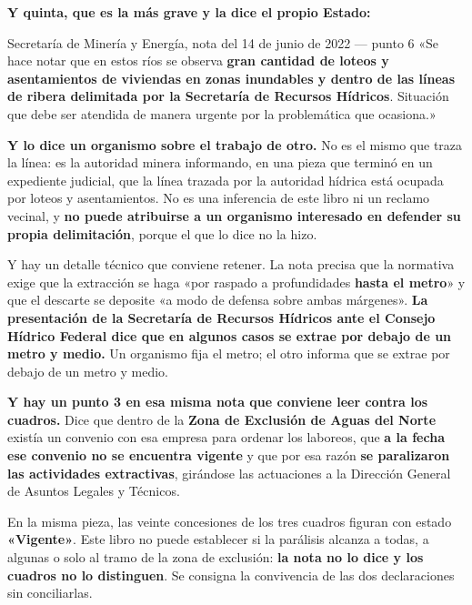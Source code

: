 \textbf{Y quinta, que es la más grave y la dice el propio Estado:}

\begin{ficha}{Secretaría de Minería y Energía, nota del 14 de junio de 2022 --- punto 6}
«Se hace notar que en estos ríos se observa \textbf{gran cantidad de loteos y asentamientos de
viviendas en zonas inundables y dentro de las líneas de ribera delimitada por la Secretaría de
Recursos Hídricos}. Situación que debe ser atendida de manera urgente por la problemática que
ocasiona.»
\end{ficha}

\textbf{Y lo dice un organismo sobre el trabajo de otro.} No es el mismo que traza la línea:
es la autoridad minera informando, en una pieza que terminó en un expediente judicial, que la
línea trazada por la autoridad hídrica está ocupada por loteos y asentamientos. No es una
inferencia de este libro ni un reclamo vecinal, y \textbf{no puede atribuirse a un organismo
interesado en defender su propia delimitación}, porque el que lo dice no la hizo.

Y hay un detalle técnico que conviene retener. La nota precisa que la normativa exige que la
extracción se haga «por raspado a profundidades \textbf{hasta el metro}» y que el descarte se
deposite «a modo de defensa sobre ambas márgenes». \textbf{La presentación de la Secretaría de
Recursos Hídricos ante el Consejo Hídrico Federal dice que en algunos casos se extrae por
debajo de un metro y medio.} Un organismo fija el metro; el otro informa que se extrae por
debajo de un metro y medio.

\begin{cautela}
\textbf{Y hay un punto 3 en esa misma nota que conviene leer contra los cuadros.} Dice que
dentro de la \textbf{Zona de Exclusión de Aguas del Norte} existía un convenio con esa empresa
para ordenar los laboreos, que \textbf{a la fecha ese convenio no se encuentra vigente} y que
por esa razón \textbf{se paralizaron las actividades extractivas}, girándose las actuaciones a
la Dirección General de Asuntos Legales y Técnicos.

En la misma pieza, las veinte concesiones de los tres cuadros figuran con estado
\textbf{«Vigente»}. Este libro no puede establecer si la parálisis alcanza a todas, a algunas o
solo al tramo de la zona de exclusión: \textbf{la nota no lo dice y los cuadros no lo
distinguen}. Se consigna la convivencia de las dos declaraciones sin conciliarlas.
\end{cautela}

